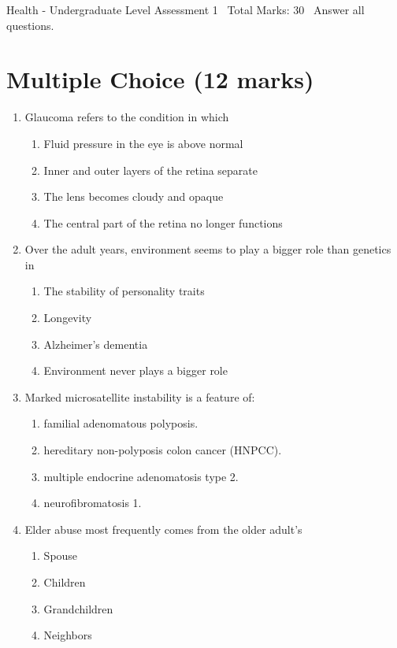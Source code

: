 \documentclass[12pt]{article}
\begin{document}
\begin{center}
Health - Undergraduate Level Assessment 1 \
Total Marks: 30 \
Answer all questions.
\end{center}

\section*{Multiple Choice (12 marks)}
\begin{enumerate}[label=\arabic*.]
\item Glaucoma refers to the condition in which
\begin{enumerate}[label=(\alph*)]
    \item Fluid pressure in the eye is above normal
    \item Inner and outer layers of the retina separate
    \item The lens becomes cloudy and opaque
    \item The central part of the retina no longer functions
\end{enumerate}
\item Over the adult years, environment seems to play a bigger role than genetics in
\begin{enumerate}[label=(\alph*)]
    \item The stability of personality traits
    \item Longevity
    \item Alzheimer's dementia
    \item Environment never plays a bigger role
\end{enumerate}
\item Marked microsatellite instability is a feature of:
\begin{enumerate}[label=(\alph*)]
    \item familial adenomatous polyposis.
    \item hereditary non-polyposis colon cancer (HNPCC).
    \item multiple endocrine adenomatosis type 2.
    \item neurofibromatosis 1.
\end{enumerate}
\item Elder abuse most frequently comes from the older adult's
\begin{enumerate}[label=(\alph*)]
    \item Spouse
    \item Children
    \item Grandchildren
    \item Neighbors

\end{enumerate}
\end{enumerate}
\end{document}
